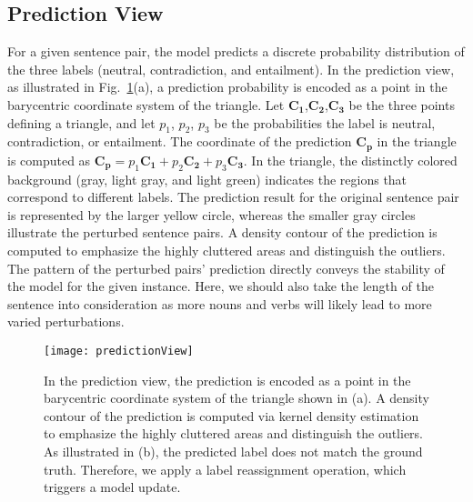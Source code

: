 
\subsection{Prediction View}
\label{sec:prediction}
For a given sentence pair, the model predicts a discrete probability distribution of the three labels (neutral, contradiction, and entailment).
%
In the prediction view, as illustrated in Fig.~\ref{fig:predictionView}(a), a prediction probability is encoded as a point in the barycentric coordinate system of the triangle.
Let $\mathbf{C_1}$,$\mathbf{C_2}$,$\mathbf{C_3}$ be the three points defining a triangle, and let $p_1$, $p_2$, $p_3$ be the probabilities the label is neutral, contradiction, or entailment. The coordinate of the prediction $\mathbf{C_p}$ in the triangle is computed as $\mathbf{C_p} = p_1\mathbf{C_1}+p_2\mathbf{C_2}+p_3\mathbf{C_3}$.
In the triangle, the distinctly colored background (gray, light gray, and light green) indicates the regions that correspond to different labels. The prediction result for the original sentence pair is represented by the larger yellow circle, whereas the smaller gray circles illustrate the perturbed sentence pairs. A density contour of the prediction is computed to emphasize the highly cluttered areas and distinguish the outliers.
The pattern of the perturbed pairs' prediction directly conveys the stability of the model for the given instance. 
Here, we should also take the length of the sentence into consideration as more nouns and verbs will likely lead to more varied perturbations.

\begin{figure}[htbp]
\centering
\vspace{-2mm}
 \texttt{[image: predictionView]}
 \vspace{-5mm}
 \caption{
In the prediction view, the prediction is encoded as a point in the barycentric coordinate system of the triangle shown in (a).
A density contour of the prediction is computed via kernel density estimation to emphasize the highly cluttered areas and distinguish the outliers.
As illustrated in (b), the predicted label does not match the ground truth. Therefore, we apply a label reassignment operation, which triggers a model update.
}
\vspace{-2mm}
\label{fig:predictionView}
\end{figure}

